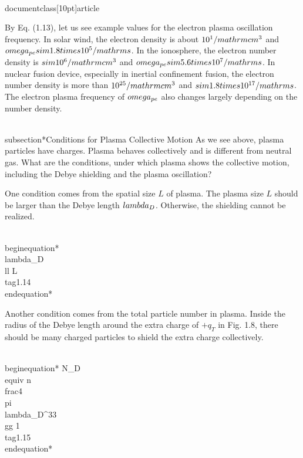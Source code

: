 \\documentclass[10pt]{article}
\begin{document}
By Eq. (1.13), let us see example values for the electron plasma oscillation frequency. In solar wind, the electron density is about $10^{1} / \\mathrm{cm}^{3}$ and $\\omega_{p e} \\sim 1.8 \\times 10^{5} / \\mathrm{s}$. In the ionosphere, the electron number density is $\\sim 10^{6} / \\mathrm{cm}^{3}$ and $\\omega_{p e} \\sim 5.6 \\times 10^{7} / \\mathrm{s}$. In nuclear fusion device, especially in inertial confinement fusion, the electron number density is more than $10^{25} / \\mathrm{cm}^{3}$ and $\\sim 1.8 \\times 10^{17} / \\mathrm{s}$. The electron plasma frequency of $\\omega_{p e}$ also changes largely depending on the number density.

\\subsection*{Conditions for Plasma Collective Motion}
As we see above, plasma particles have charges. Plasma behaves collectively and is different from neutral gas. What are the conditions, under which plasma shows the collective motion, including the Debye shielding and the plasma oscillation?

One condition comes from the spatial size $L$ of plasma. The plasma size $L$ should be larger than the Debye length $\\lambda_{D}$. Otherwise, the shielding cannot be realized.


\\begin{equation*}
\\lambda_{D} \\ll L \\tag{1.14}
\\end{equation*}


Another condition comes from the total particle number in plasma. Inside the radius of the Debye length around the extra charge of $+q_{T}$ in Fig. 1.8, there should be many charged particles to shield the extra charge collectively.


\\begin{equation*}
N_{D} \\equiv n \\frac{4 \\pi \\lambda_{D}^{3}}{3} \\gg 1 \\tag{1.15}
\\end{equation*}
\end{document}
